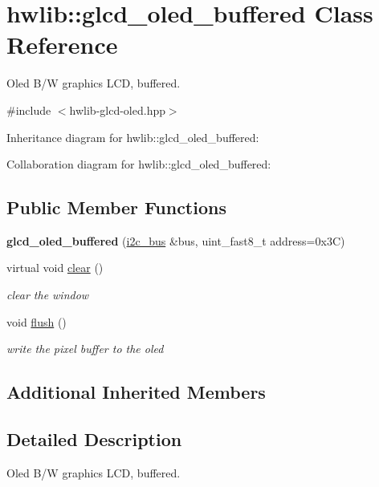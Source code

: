 \hypertarget{classhwlib_1_1glcd__oled__buffered}{}\section{hwlib\+:\+:glcd\+\_\+oled\+\_\+buffered Class Reference}
\label{classhwlib_1_1glcd__oled__buffered}


Oled B/W graphics L\+CD, buffered.  




{\ttfamily \#include $<$hwlib-\/glcd-\/oled.\+hpp$>$}



Inheritance diagram for hwlib\+:\+:glcd\+\_\+oled\+\_\+buffered\+:


Collaboration diagram for hwlib\+:\+:glcd\+\_\+oled\+\_\+buffered\+:
\subsection*{Public Member Functions}
\begin{DoxyCompactItemize}
\item 
\mbox{\label{classhwlib_1_1glcd__oled__buffered_ac4ad2a9a1d2f5b862a0833c6096a08af}} 
{\bfseries glcd\+\_\+oled\+\_\+buffered} (\hyperlink{classhwlib_1_1i2c__bus}{i2c\+\_\+bus} \&bus, uint\+\_\+fast8\+\_\+t address=0x3\+C)
\item 
virtual void \hyperlink{classhwlib_1_1glcd__oled__buffered_a1df3ca6d163e33b2edf1242acf47342a}{clear} ()
\begin{DoxyCompactList}\small\item\em clear the window \end{DoxyCompactList}\item 
void \hyperlink{classhwlib_1_1glcd__oled__buffered_a68ed87e12c7f7ed0abe621b14af9d604}{flush} ()
\begin{DoxyCompactList}\small\item\em write the pixel buffer to the oled \end{DoxyCompactList}\end{DoxyCompactItemize}
\subsection*{Additional Inherited Members}


\subsection{Detailed Description}
Oled B/W graphics L\+CD, buffered. 

